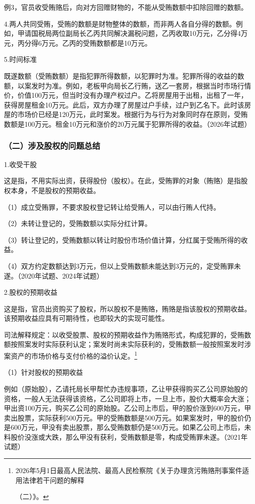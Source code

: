 例3，官员收受贿赂后，向对方回赠财物的，不能从受贿数额中扣除回赠的数额。

4.两人共同受贿，受贿的数额是财物整体的数额，而非两人各自分得的数额。例如，甲请国税局两位副局长乙丙共同解决漏税问题，乙丙收取10万元，乙分得4万元，丙分得6万元。乙丙的受贿数额都是10万元。

5.时间标准

既遂数额（受贿数额）是指犯罪所得数额，以犯罪时为准。犯罪所得的收益的数额，以案发时为准。例如，老板甲向局长乙行贿，送乙一套房，根据当时市场行情价，价值100万元，但当时没有办理产权过户。乙将房屋用于出租，出租了一年，获得房屋租金10万元。此后，双方办理了房屋过户手续，过户到乙名下。此时该房屋的市场价已经是120万元，此时案发。根据行为与行为对象同时存在原则，受贿数额是100万元。租金10万元和涨价的20万元属于犯罪所得的收益。（2026年试题）

\subsubsection*{（二）涉及股权的问题总结}

1.收受干股

这是指，不用实际出资，获得股份（股权）。在此，受贿罪的对象（贿赂）是指股权本身，不是股权的预期收益。

（1）成立受贿罪，不要求股权登记转让给受贿人，可以由行贿人代持。

（2）未转让登记的，受贿数额以实际分红计算。

（3）转让登记的，受贿数额以转让时股份市场价值计算，分红属于受贿所得的收益。

（4）双方约定数额达到3万元，但以上受贿数额未能达到3万元的，定受贿罪未遂。（2020年试题、2024年试题）

2.股权的预期收益

这是指，官员出资购买了股权，所以股权不是贿赂，贿赂是指该股权的预期收益。该预期收益应具有可期待性，也即较大的实现可能性。

司法解释规定：以收受股票、股权的预期收益作为贿赂形式，构成犯罪的，受贿数额按照案发时实际获利认定；案发时尚未实际获利的，受贿数额一般按照案发时涉案资产的市场价格与支付价格的溢价认定。\footnote{2026年5月1日最高人民法院、最高人民检察院《关于办理贪污贿赂刑事案件适用法律若干问题的解释

（二）》。}

（1）针对股权的预期收益

例如（原始股），乙请托局长甲帮忙办违规事项，乙让甲获得购买乙公司原始股的资格，一般人无法获得该资格，乙公司即将上市，一旦上市，股价大概率会大涨；甲出资100万元，购买乙公司的原始股。乙公司上市后，甲的股价涨到600万元，甲卖出股票，实际获利500万元。甲的受贿数额是500万元。如果案发时，甲的股价仍是600万元，甲没有卖出股票，那么受贿数额仍是500万元。如果乙公司上市后，未料股价没涨或大跌，那么甲没有获利，受贿数额是零，构成受贿罪未遂。（2021年试题）

